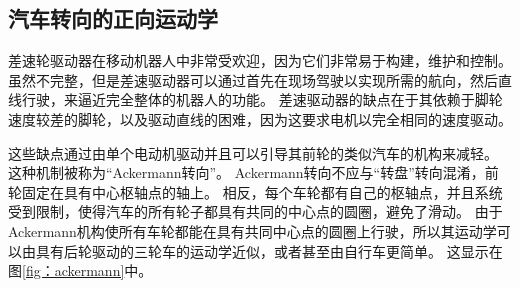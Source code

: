 \subsection{汽车转向的正向运动学}

差速轮驱动器在移动机器人中非常受欢迎，因为它们非常易于构建，维护和控制。 虽然不完整，但是差速驱动器可以通过首先在现场驾驶以实现所需的航向，然后直线行驶，来逼近完全整体的机器人的功能。 差速驱动器的缺点在于其依赖于脚轮速度较差的脚轮，以及驱动直线的困难，因为这要求电机以完全相同的速度驱动。


这些缺点通过由单个电动机驱动并且可以引导其前轮的类似汽车的机构来减轻。 这种机制被称为“Ackermann转向”。 Ackermann转向不应与“转盘”转向混淆，前轮固定在具有中心枢轴点的轴上。 相反，每个车轮都有自己的枢轴点，并且系统受到限制，使得汽车的所有轮子都具有共同的中心点的圆圈，避免了滑动。 由于Ackermann机构使所有车轮都能在具有共同中心点的圆圈上行驶，所以其运动学可以由具有后轮驱动的三轮车的运动学近似，或者甚至由自行车更简单。 这显示在图\ref {fig：ackermann}中。

